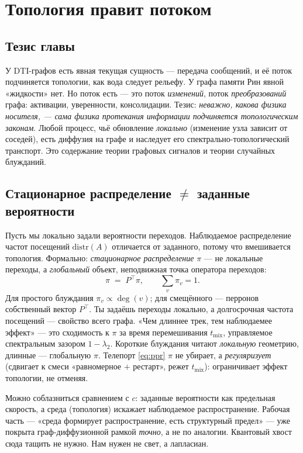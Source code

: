 \chapter{Топология правит потоком}
\label{ch:topology}

\section{Тезис главы}

У DTI-графов есть явная текущая сущность — передача сообщений, и её поток подчиняется
топологии, как вода следует рельефу. У графа памяти Рин явной «жидкости» нет. Но
поток есть — это поток \emph{изменений}, поток \emph{преобразований} графа:
активации, уверенности, консолидации. Тезис: \emph{неважно, какова физика носителя,
— сама физика протекания информации подчиняется топологическим законам}. Любой
процесс, чьё обновление \emph{локально} (изменение узла зависит от соседей), есть
диффузия на графе и наследует его спектрально-топологический транспорт. Это
содержание теории графовых сигналов и теории случайных блужданий.

\section{Стационарное распределение $\ne$ заданные вероятности}

Пусть мы локально задали вероятности переходов. Наблюдаемое распределение частот
посещений $\text{distr}(A)$ отличается от заданного, потому что вмешивается
топология. Формально: \emph{стационарное распределение} $\pi$ — не локальные
переходы, а \emph{глобальный} объект, неподвижная точка оператора переходов:
\begin{equation}
\pi \;=\; P^\top \pi,\qquad \sum_v \pi_v=1 .
\end{equation}
Для простого блуждания $\pi_v\propto\deg(v)$; для смещённого — перронов собственный
вектор $P^\top$. Ты задаёшь переходы локально, а долгосрочная частота посещений —
свойство всего графа. «Чем длиннее трек, тем наблюдаемее эффект» — это сходимость к
$\pi$ за время перемешивания $t_{\text{mix}}$, управляемое спектральным зазором
$1-\lambda_2$. Короткие блуждания читают \emph{локальную} геометрию, длинные —
глобальную $\pi$. Телепорт \eqref{eq:ppr} $\pi$ не убирает, а \emph{регуляризует}
(сдвигает к смеси «равномерное $+$ рестарт», режет $t_{\text{mix}}$): ограничивает
эффект топологии, не отменяя.

\begin{intuition}
Можно соблазниться сравнением с $c$: заданные вероятности как предельная скорость, а
среда (топология) искажает наблюдаемое распространение. Рабочая часть — «среда
формирует распространение, есть структурный предел» — уже покрыта граф-диффузионной
рамкой \emph{точно}, а не по аналогии. Квантовый хвост сюда тащить не нужно. Нам
нужен не свет, а лапласиан.
\end{intuition}


